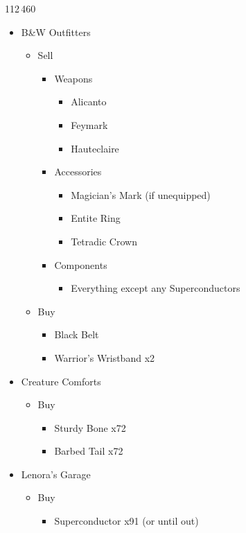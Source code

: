 \begin{shop}{112\,460}
		\begin{itemize}
			\item B\&W Outfitters
			      \begin{itemize}
				      \item Sell
				            \begin{itemize}
					            \item Weapons
					                  \begin{itemize}
						                  \item Alicanto
						                  \item Feymark
						                  \item Hauteclaire
					                  \end{itemize}
					            \item Accessories
					                  \begin{itemize}
						                  \item Magician's Mark (if unequipped)
						                  \item Entite Ring
						                  \item Tetradic Crown
					                  \end{itemize}
					            \item Components
					                  \begin{itemize}
						                  \item Everything except any Superconductors
					                  \end{itemize}
				            \end{itemize}
				      \item Buy
				            \begin{itemize}
					            \item Black Belt
					            \item Warrior's Wristband x2
				            \end{itemize}
			      \end{itemize}
			\item Creature Comforts
			      \begin{itemize}
				      \item Buy
				            \begin{itemize}
					            \item Sturdy Bone x72
					            \item Barbed Tail x72
				            \end{itemize}
			      \end{itemize}
			\item Lenora's Garage
			      \begin{itemize}
				      \item Buy
				            \begin{itemize}
					            \item Superconductor x91 (or until out)
				            \end{itemize}
			      \end{itemize}
		\end{itemize}
\end{shop}
